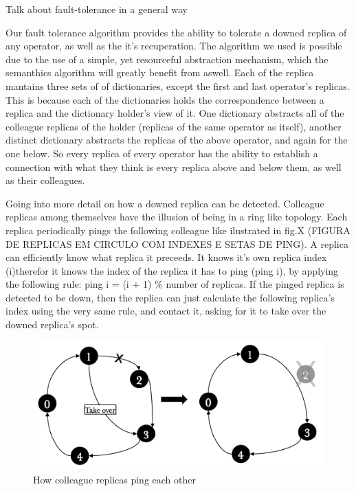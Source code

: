 \documentclass[times, 10pt,twocolumn]{article}
\begin{document}
Talk about fault-tolerance in a general way

Our fault tolerance algorithm provides the ability to tolerate a downed replica of any operator, as well as the it's recuperation.
The algorithm we used is possible due to the use of a simple, yet resourceful abstraction mechanism, which the semanthics algorithm will greatly benefit from aswell.
Each of the replica mantains three sets of of dictionaries, except the first and last operator's replicas. This is because each of the dictionaries holds the correspondence between a replica and the dictionary holder's view of it.
One dictionary abstracts all of the colleague replicas of the holder (replicas of the same operator as itself), another distinct dictionary abstracts the replicas of the above operator, and again for the one below.
So every replica of every operator has the ability to establish a connection with what they think is every replica above and below them, as well as their colleagues.


Going into more detail on how a downed replica can be detected.
Colleague replicas among themselves have the illusion of being in a ring like topology. Each replica periodically pings the following colleague like ilustrated in fig.X (FIGURA DE REPLICAS EM CIRCULO COM INDEXES E SETAS DE PING). A replica can efficiently know what replica it preceeds. It knows it's own replica index (i)therefor it knows the index of the replica it has to ping (ping i), by applying the following rule: ping i = (i + 1) \% number of replicas.
If the pinged replica is detected to be down, then the replica can just calculate the following replica's index using the very same rule, and contact it, asking for it to take over the downed replica's spot.
\begin{figure}[h] 
	\includegraphics[width=\columnwidth]{fault_detection}
	\caption{How colleague replicas ping each other}
\end{figure}
\end{document}
